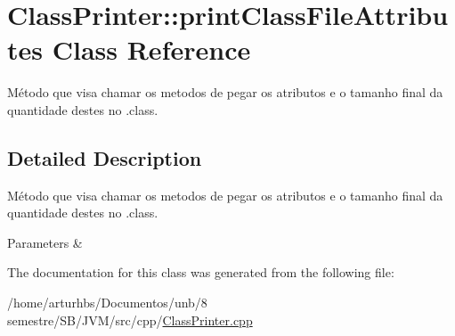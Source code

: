 \hypertarget{classClassPrinter_1_1printClassFileAttributes}{}\section{Class\+Printer\+:\+:print\+Class\+File\+Attributes Class Reference}
\label{classClassPrinter_1_1printClassFileAttributes}


Método que visa chamar os metodos de pegar os atributos e o tamanho final da quantidade destes no .class.  




\subsection{Detailed Description}
Método que visa chamar os metodos de pegar os atributos e o tamanho final da quantidade destes no .class. 


\begin{DoxyParams}{Parameters}
{\em } & \\
\hline
\end{DoxyParams}


The documentation for this class was generated from the following file\+:\begin{DoxyCompactItemize}
\item 
/home/arturhbs/\+Documentos/unb/8 semestre/\+S\+B/\+J\+V\+M/src/cpp/\hyperlink{ClassPrinter_8cpp}{Class\+Printer.\+cpp}\end{DoxyCompactItemize}
